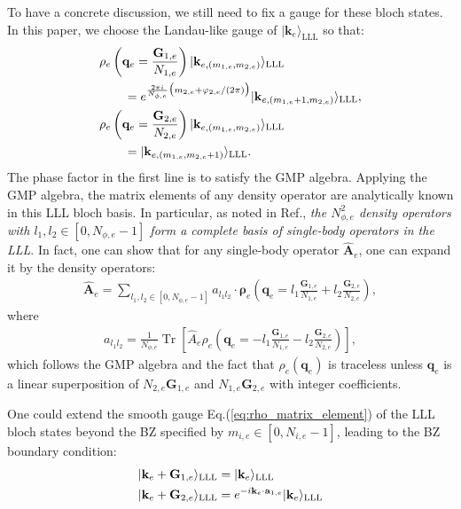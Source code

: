 To have a concrete discussion, we still need to fix a gauge for these bloch states. In this paper, we choose the Landau-like gauge of $|\mathbf k_e\rangle_{\text{LLL}}$ so that:
\begin{align}
     & \rho_e\left(\mathbf q_e=\frac{\mathbf G_{1,e}}{N_{1,e}}\right)|\mathbf k_{e,(m_{1,e},m_{2,e})}\rangle_{\text{LLL}}\notag                    \\
     & \quad\quad=e^{\frac{2\pi i}{N_{\phi,e}}\big(m_{2,e}+\varphi_{2,e}/(2\pi)\big)}|\mathbf k_{e,(m_{1,e}+1,m_{2,e})}\rangle_{\text{LLL}},\notag \\
     & \rho_e\left(\mathbf q_e=\frac{\mathbf G_{2,e}}{N_{2,e}}\right)|\mathbf k_{e,(m_{1,e},m_{2,e})}\rangle_{\text{LLL}}\notag                    \\
     & \quad\quad=|\mathbf k_{e,(m_{1,e},m_{2,e}+1)}\rangle_{\text{LLL}}.\label{eq:rho_matrix_element}
\end{align}
The phase factor in the first line is to satisfy the GMP algebra. Applying the GMP algebra, the matrix elements of any density operator are analytically known in this LLL bloch basis. In particular, as noted in Ref.\cite{murthy2012hamiltonian}, \emph{the $N_{\phi,e}^2$ density operators with $l_1,l_2\in [0,N_{\phi,e}-1]$ form a complete basis of single-body operators in the LLL}. In fact, one can show that for any single-body operator $\hat{\mathbf A}_e$, one can expand it by the density operators:
\begin{align}
    \hat{\mathbf A}_e=\sum_{l_1,l_2\in [0,N_{\phi,e}-1]} a_{l_1 l_2}\cdot\pmb{\boldsymbol\rho}_e\left(\mathbf q_e=l_1\frac{\mathbf G_{1,e}}{N_{1,e}}+l_2\frac{\mathbf G_{2,e}}{N_{2,e}}\right),
\end{align}
where
\begin{align}
    a_{l_1 l_2}=\frac{1}{N_{\phi,e}}\mathop{\mathrm{Tr}}\left[\hat A_e\rho_e\left(\mathbf q_e=-l_1\frac{\mathbf G_{1,e}}{N_{1,e}}-l_2\frac{\mathbf G_{2,e}}{N_{2,e}}\right)\right],
\end{align}
which follows the GMP algebra and the fact that $\rho_e(\mathbf q_e)$ is traceless unless $\mathbf q_e$ is a linear superposition of $N_{2,e}\mathbf G_{1,e}$ and $N_{1,e}\mathbf G_{2,e}$ with integer coefficients.



One could extend the smooth gauge Eq.(\ref{eq:rho_matrix_element}) of the LLL bloch states beyond the BZ specified by $m_{i,e}\in [0,N_{i,e}-1]$, leading to the BZ boundary condition:
\begin{align}
    |\mathbf k_e+\mathbf G_{1,e}\rangle_{\text{LLL}} & =|\mathbf k_e\rangle_{\text{LLL}}\notag                                                 \\
    |\mathbf k_e+\mathbf G_{2,e}\rangle_{\text{LLL}} & =e^{-i \mathbf k_e\cdot\mathbf a_{1,e}}|\mathbf k_e\rangle_{\text{LLL}}\label{eq:BZ_BC}
\end{align}


